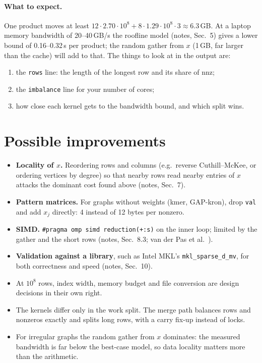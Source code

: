\documentclass[11pt,a4paper]{article}
\begin{document}
\paragraph{What to expect.} One product moves at least
$12\cdot2.70\cdot10^8 + 8\cdot1.29\cdot10^8\cdot3 \approx 6.3$\,GB. At a laptop memory
bandwidth of 20--40\,GB/s the roofline model (notes, Sec.~5) gives a lower bound of
0.16--0.32\,s per product; the random gather from $x$ (1\,GB, far larger than the cache)
will add to that. The things to look at in the output are:
\begin{enumerate}
  \item the \texttt{rows} line: the length of the longest row and its share of nnz;
  \item the \texttt{imbalance} line for your number of cores;
  \item how close each kernel gets to the bandwidth bound, and which split wins.
\end{enumerate}

\section{Possible improvements}
\begin{itemize}
  \item \textbf{Locality of $x$.} Reordering rows and columns (e.g.\ reverse Cuthill--McKee,
        or ordering vertices by degree) so that nearby rows read nearby entries of $x$
        attacks the dominant cost found above (notes, Sec.~7).
  \item \textbf{Pattern matrices.} For graphs without weights (kmer, GAP-kron), drop
        \texttt{val} and add $x_j$ directly: 4 instead of 12 bytes per nonzero.
  \item \textbf{SIMD.} \texttt{\#pragma omp simd reduction(+:s)} on the inner loop; limited
        by the gather and the short rows (notes, Sec.~8.3; van der Pas et al.~\cite{vdp}).
  \item \textbf{Validation against a library}, such as Intel MKL's
        \texttt{mkl\_sparse\_d\_mv}, for both correctness and speed (notes, Sec.~10).
\end{itemize}

\begin{keyidea}
\begin{itemize}
  \item At $10^8$ rows, index width, memory budget and file conversion are design decisions
        in their own right.
  \item The kernels differ only in the work split. The merge path balances rows and
        nonzeros exactly and splits long rows, with a carry fix-up instead of locks.
  \item For irregular graphs the random gather from $x$ dominates: the measured bandwidth is
        far below the best-case model, so data locality matters more than the arithmetic.
\end{itemize}
\end{keyidea}
\end{document}
